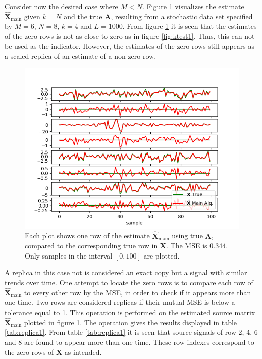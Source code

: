 \noindent
Consider now the desired case where $M < N$.
Figure \ref{fig:ktest3} visualizes the estimate $\hat{\mathbf{X}}_{\text{main}}$ given $k=N$ and the true $\textbf{A}$, resulting from a stochastic data set specified by $M = 6$, $N = 8$, $k = 4$ and $L = 1000$.
From figure \ref{fig:ktest3} it is seen that the estimates of the zero rows is not as close to zero as in figure \ref{fig:ktest1}. 
Thus, this can not be used as the indicator. 
However, the estimates of the zero rows still appears as a scaled replica of an estimate of a non-zero row. 
\begin{figure}[H]
	\centering
	\includegraphics[scale=0.5]{figures/ch_estimate/k_test3.png}
	\caption{Each plot shows one row of the estimate $\hat{\mathbf{X}}_{\text{main}}$ using true $\mathbf{A}$, compared to the corresponding true row in $\mathbf{X}$. The MSE is $0.344$. Only samples in the interval $[0,100]$ are plotted.}
	\label{fig:ktest3}
\end{figure}
\noindent
A replica in this case not is considered an exact copy but a signal with similar trends over time.
One attempt to locate the zero rows is to compare each row of $\hat{\mathbf{X}}_{\text{main}}$ to every other row by the MSE, in order to check if it appears more than one time.
Two rows are considered replicas if their mutual MSE is below a tolerance equal to 1. 
This operation is performed on the estimated source matrix $\hat{\mathbf{X}}_{\text{main}}$ plotted in figure \ref{fig:ktest3}.
The operation gives the results displayed in table \ref{tab:replica1}.
From table \ref{tab:replica1} it is seen that source signals of row 2, 4, 6 and 8 are found to appear more than one time. These row indexes correspond to the zero rows of $\mathbf{X}$ as intended. 
